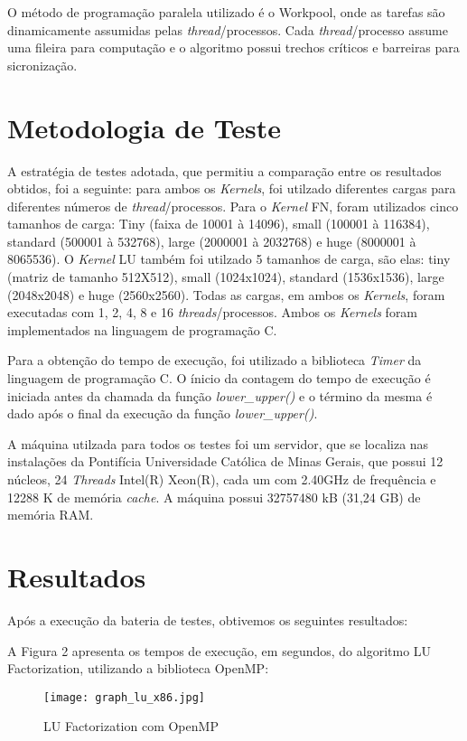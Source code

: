 \documentclass[12pt]{article}
\begin{document}
O método de programação paralela utilizado é o Workpool, onde as tarefas são dinamicamente assumidas pelas \textit{thread}/processos. Cada \textit{thread}/processo assume uma fileira para computação e o algoritmo possui trechos críticos e barreiras para sicronização. 


\section{Metodologia de Teste}
A estratégia de testes adotada, que permitiu a comparação entre os resultados obtidos, foi a seguinte: para ambos os \textit{Kernels}, foi utilzado diferentes cargas para diferentes números de \textit{thread}/processos. Para o \textit{Kernel} FN, foram utilizados cinco tamanhos de carga: Tiny (faixa de 10001 à 14096), small (100001 à 116384), standard (500001 à 532768), large (2000001 à 2032768) e huge (8000001 à 8065536). O \textit{Kernel} LU também foi utilzado 5 tamanhos de carga, são elas: tiny (matriz de tamanho 512X512), small (1024x1024), standard (1536x1536), large (2048x2048) e huge (2560x2560). Todas as cargas, em ambos os \textit{Kernels}, foram executadas com 1, 2, 4, 8 e 16 \textit{threads}/processos. Ambos os \textit{Kernels} foram implementados na linguagem de programação C.

Para a obtenção do tempo de execução, foi utilizado a biblioteca \textit{Timer} da linguagem de programação C. O ínicio da contagem do tempo de execução é iniciada antes da chamada da função \textit{lower\_upper()} e o término da mesma é dado após o final da execução da função \textit{lower\_upper()}.

A máquina utilzada para todos os testes foi um servidor, que se localiza nas instalações da Pontifícia Universidade Católica de Minas Gerais, que possui 12 núcleos, 24 \textit{Threads} Intel(R) Xeon(R), cada um com 2.40GHz de frequência e 12288 K de memória \textit{cache}. A máquina possui 32757480 kB (31,24 GB) de memória RAM. 



\section{Resultados}
Após a execução da bateria de testes, obtivemos os seguintes resultados:


A Figura 2 apresenta os tempos de execução, em segundos, do algoritmo LU Factorization, utilizando a biblioteca OpenMP:

\begin{figure}[h!]
  \centering
  \texttt{[image: graph\_lu\_x86.jpg]}
  \caption{LU Factorization com OpenMP}
  \label{fig:FN OpenMP}
\end{figure}
\end{document}
